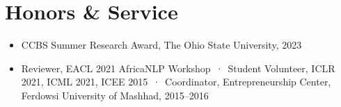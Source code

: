 \documentclass[10pt,letterpaper]{article}
\begin{document}
\section{Honors \& Service}
\begin{itemize}
  \item CCBS Summer Research Award, The Ohio State University, 2023
  \item Reviewer, EACL 2021 AfricaNLP Workshop \,·\, Student Volunteer, ICLR 2021, ICML 2021, ICEE 2015
    \,·\, Coordinator, Entrepreneurship Center, Ferdowsi University of Mashhad, 2015--2016
\end{itemize}
\end{document}
